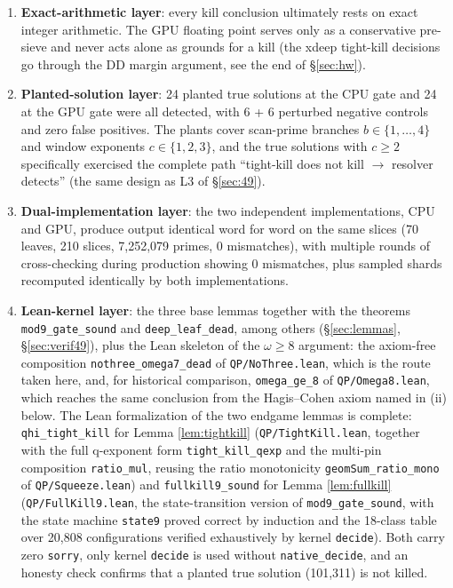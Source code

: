 \documentclass[11pt]{article}
\theoremstyle{remark}
\begin{document}
\begin{enumerate}
\item \textbf{Exact-arithmetic layer}: every kill conclusion ultimately rests on exact integer arithmetic. The GPU floating point serves only as a conservative pre-sieve and never acts alone as grounds for a kill (the xdeep tight-kill decisions go through the DD margin argument, see the end of \S\ref{sec:hw}).
\item \textbf{Planted-solution layer}: 24 planted true solutions at the CPU gate and 24 at the GPU gate were all detected, with 6 + 6 perturbed negative controls and zero false positives. The plants cover scan-prime branches $b \in \{1, \dots, 4\}$ and window exponents $c \in \{1, 2, 3\}$, and the true solutions with $c \ge 2$ specifically exercised the complete path ``tight-kill does not kill $\to$ resolver detects'' (the same design as L3 of \S\ref{sec:49}).
\item \textbf{Dual-implementation layer}: the two independent implementations, CPU and GPU, produce output identical word for word on the same slices (70 leaves, 210 slices, 7,252,079 primes, 0 mismatches), with multiple rounds of cross-checking during production showing 0 mismatches, plus sampled shards recomputed identically by both implementations.
\item \textbf{Lean-kernel layer}: the three base lemmas together with the theorems \texttt{mod9\_gate\_sound} and \texttt{deep\_leaf\_dead}, among others (\S\ref{sec:lemmas}, \S\ref{sec:verif49}), plus the Lean skeleton of the $\omega \ge 8$ argument: the axiom-free composition \texttt{nothree\_omega7\_dead} of \texttt{QP/NoThree.lean}, which is the route taken here, and, for historical comparison, \texttt{omega\_ge\_8} of \texttt{QP/Omega8.lean}, which reaches the same conclusion from the Hagis--Cohen axiom named in (ii) below. The Lean formalization of the two endgame lemmas is complete: \texttt{qhi\_tight\_kill} for Lemma \ref{lem:tightkill} (\texttt{QP/TightKill.lean}, together with the full q-exponent form \texttt{tight\_kill\_qexp} and the multi-pin composition \texttt{ratio\_mul}, reusing the ratio monotonicity \texttt{geomSum\_ratio\_mono} of \texttt{QP/Squeeze.lean}) and \texttt{fullkill9\_sound} for Lemma \ref{lem:fullkill} (\texttt{QP/FullKill9.lean}, the state-transition version of \texttt{mod9\_gate\_sound}, with the state machine \texttt{state9} proved correct by induction and the 18-class table over 20,808 configurations verified exhaustively by kernel \texttt{decide}). Both carry zero \texttt{sorry}, only kernel \texttt{decide} is used without \texttt{native\_decide}, and an honesty check confirms that a planted true solution (101,311) is not killed.


\end{enumerate}
\end{document}
